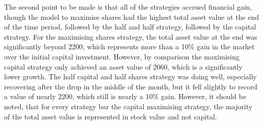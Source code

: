 The second point to be made is that all of the strategies accrued financial gain, though the model to maximise shares had the highest total asset value at the end of the time period, followed by the half and half strategy, followed by the capital strategy. For the maximising shares strategy, the total asset value at the end was significantly beyond 2200, which represents more than a 10\% gain in the market over the initial capital investment. However, by comparison the maximising capital strategy only achieved an asset value of 2060, which is a significantly lower growth. The half capital and half shares strategy was doing well, especially recovering after the drop in the middle of the month, but it fell slightly to record a value of nearly 2200, which still is nearly a 10\% gain. However, it should be noted, that for every strategy bar the capital maximising strategy, the majority of the total asset value is represented in stock value and not capital.

